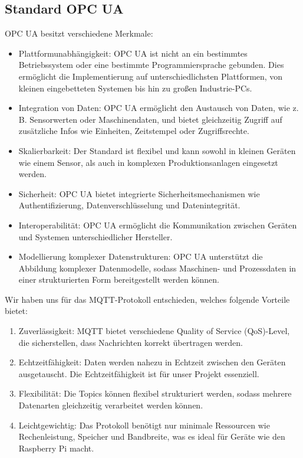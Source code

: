 \subsection{Standard OPC UA}
OPC UA besitzt verschiedene Merkmale:
\begin{itemize}
    \item Plattformunabhängigkeit: 
    \newline OPC UA ist nicht an ein bestimmtes Betriebssystem oder eine bestimmte Programmiersprache gebunden. Dies ermöglicht die Implementierung auf unterschiedlichsten Plattformen, von kleinen eingebetteten Systemen bis hin zu großen Industrie-PCs.
    \item Integration von Daten: 
    \newline OPC UA ermöglicht den Austausch von Daten, wie z. B. Sensorwerten oder Maschinendaten, und bietet gleichzeitig Zugriff auf zusätzliche Infos wie Einheiten, Zeitstempel oder Zugriffsrechte.
    \item  Skalierbarkeit: 
    \newline Der Standard ist flexibel und kann sowohl in kleinen Geräten wie einem Sensor, als auch in komplexen Produktionsanlagen eingesetzt werden.
    \item Sicherheit:
    \newline OPC UA bietet integrierte Sicherheitsmechanismen wie Authentifizierung, Datenverschlüsselung und Datenintegrität.
    \item Interoperabilität:
    \newline OPC UA ermöglicht die Kommunikation zwischen Geräten und Systemen unterschiedlicher Hersteller.  
    \item Modellierung komplexer Datenstrukturen:
    \newline OPC UA unterstützt die Abbildung komplexer Datenmodelle, sodass Maschinen- und Prozessdaten in einer strukturierten Form bereitgestellt werden können.
\end{itemize}
Wir haben uns für das MQTT-Protokoll entschieden, welches folgende Vorteile bietet:
\begin{enumerate}
    \item Zuverlässigkeit: MQTT bietet verschiedene Quality of Service (QoS)-Level, die sicherstellen, dass Nachrichten korrekt übertragen werden.
    \item Echtzeitfähigkeit: Daten werden nahezu in Echtzeit zwischen den Geräten ausgetauscht. Die Echtzeitfähigkeit ist für unser Projekt essenziell.
    \item Flexibilität: Die Topics können flexibel strukturiert werden, sodass mehrere Datenarten gleichzeitig verarbeitet werden können.
    \item Leichtgewichtig: Das Protokoll benötigt nur minimale Ressourcen wie Rechenleistung, Speicher und Bandbreite, was es ideal für Geräte wie den Raspberry Pi macht.
\end{enumerate}



